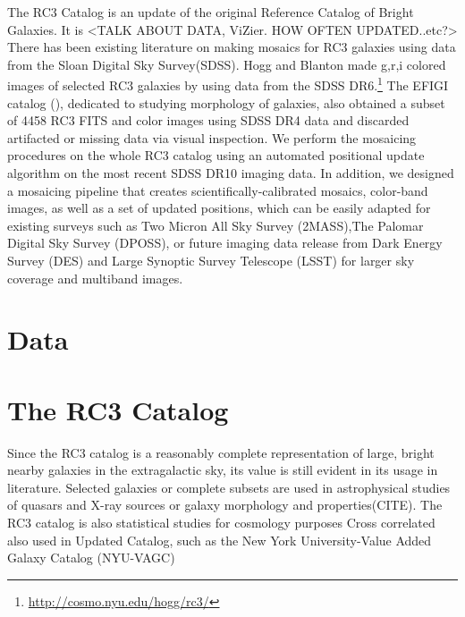 \documentclass[5p]{elsarticle}
\begin{document}
The RC3 Catalog is an update of the original Reference Catalog of Bright Galaxies. It is 
<TALK ABOUT DATA, ViZier. HOW OFTEN UPDATED..etc?> 
\\
\indent
There has been existing literature on making mosaics for RC3 galaxies using data from the Sloan Digital Sky Survey(SDSS). Hogg and Blanton made g,r,i colored images of selected RC3 galaxies by using data from the SDSS DR6.\footnote{\url{http://cosmo.nyu.edu/hogg/rc3/}} The EFIGI catalog (\citet{efigi}), dedicated to studying morphology of galaxies, also  obtained a subset of 4458 RC3 FITS and color images using SDSS DR4 data and discarded artifacted or missing data via visual inspection. We perform the mosaicing procedures on the whole RC3 catalog using an automated positional update algorithm on the most recent SDSS DR10 imaging data. In addition, we designed a mosaicing pipeline that creates scientifically-calibrated mosaics, color-band images, as well as a set of updated positions, which can be easily adapted for existing surveys such as Two Micron All Sky Survey  (2MASS),The Palomar Digital Sky Survey (DPOSS), or future imaging data release from  Dark Energy Survey (DES) and Large Synoptic Survey Telescope (LSST) for larger sky coverage and multiband images.
\section{Data}
	\section{The RC3 Catalog}

	Since the RC3 catalog is a reasonably complete representation of large, bright nearby galaxies in the extragalactic sky, its 
value is still evident in its usage in literature. Selected galaxies or complete subsets are used in astrophysical studies of  quasars and X-ray sources%
 or  galaxy morphology and properties(CITE).  The RC3 catalog is also statistical studies  for cosmology purposes Cross correlated also used in  Updated Catalog, such as the New York University-Value Added Galaxy Catalog (NYU-VAGC)
\end{document}
